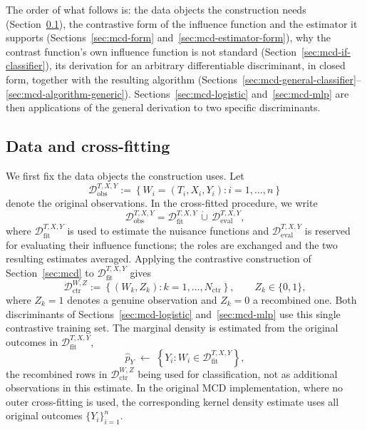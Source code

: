 \documentclass[11pt]{article}
\theoremstyle{plain}
\theoremstyle{definition}
\theoremstyle{remark}
\newcommand{\Dobs}{\ensuremath{\mathcal{D}_{\mathrm{obs}}^{T,X,Y}}}
\newcommand{\Dfit}{\ensuremath{\mathcal{D}_{\mathrm{fit}}^{T,X,Y}}}
\newcommand{\Deval}{\ensuremath{\mathcal{D}_{\mathrm{eval}}^{T,X,Y}}}
\newcommand{\Dctr}{\ensuremath{\mathcal{D}_{\mathrm{ctr}}^{W,Z}}}
\begin{document}
The order of what follows is: the data objects the construction needs
(Section~\ref{sec:setting-mcd}), the contrastive form of the influence function and the
estimator it supports (Sections~\ref{sec:mcd-form} and~\ref{sec:mcd-estimator-form}), why the
contrast function's own influence function is not standard
(Section~\ref{sec:mcd-if-classifier}), its derivation for an arbitrary differentiable
discriminant, in closed form, together with the resulting algorithm
(Sections~\ref{sec:mcd-general-classifier}--\ref{sec:mcd-algorithm-generic}).
Sections~\ref{sec:mcd-logistic} and~\ref{sec:mcd-mlp} are then applications of the general
derivation to two specific discriminants.

\subsection{Data and cross-fitting}
\label{sec:setting-mcd}

We first fix the data objects the construction uses. Let
\begin{equation*}
\Dobs
 := \left\{W_i=(T_i,X_i,Y_i):i=1,\ldots,n\right\}
\end{equation*}
denote the original observations. In the cross-fitted procedure, we write
\begin{equation*}
\Dobs=\Dfit\,\dot\cup\,\Deval,
\end{equation*}
where $\Dfit$ is used to estimate the nuisance functions and $\Deval$ is reserved for
evaluating their influence functions; the roles are exchanged and the two resulting estimates
averaged. Applying the contrastive construction of Section~\ref{sec:mcd} to $\Dfit$ gives
\begin{equation*}
\Dctr
 := \left\{(W_k,Z_k):k=1,\ldots,N_{\mathrm{ctr}}\right\},
\qquad Z_k\in\{0,1\},
\end{equation*}
where $Z_k=1$ denotes a genuine observation and $Z_k=0$ a recombined one. Both discriminants of
Sections~\ref{sec:mcd-logistic} and~\ref{sec:mcd-mlp} use this single contrastive training set.
The marginal density is estimated from the original outcomes in $\Dfit$,
\begin{equation*}
\widehat p_Y
\;\leftarrow\;
\left\{Y_i:W_i\in\Dfit\right\} ,
\end{equation*}
the recombined rows in $\Dctr$ being used for classification, not as additional observations in
this estimate. In the original MCD implementation, where no outer cross-fitting is used, the
corresponding kernel density estimate uses all original outcomes $\{Y_i\}_{i=1}^n$.
\end{document}
